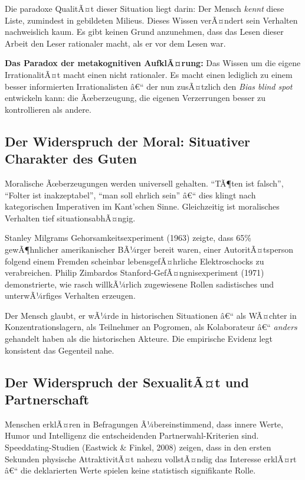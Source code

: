 ﻿\documentclass[12pt, a4paper]{article}
\begin{document}
Die paradoxe QualitÃ¤t dieser Situation liegt darin: Der Mensch \emph{kennt} diese
Liste, zumindest in gebildeten Milieus. Dieses Wissen verÃ¤ndert sein Verhalten
nachweislich kaum. Es gibt keinen Grund anzunehmen, dass das Lesen dieser Arbeit
den Leser rationaler macht, als er vor dem Lesen war.

\begin{infobox}
\textbf{Das Paradox der metakognitiven AufklÃ¤rung:} Das Wissen um die eigene
IrrationalitÃ¤t macht einen nicht rationaler. Es macht einen lediglich zu einem
besser informierten Irrationalisten â€“ der nun zusÃ¤tzlich den \emph{Bias blind spot}
entwickeln kann: die Ãœberzeugung, die eigenen Verzerrungen besser zu kontrollieren
als andere.
\end{infobox}

\subsection{Der Widerspruch der Moral: Situativer Charakter des Guten}

Moralische Ãœberzeugungen werden universell gehalten. \enquote{TÃ¶ten ist falsch},
\enquote{Folter ist inakzeptabel}, \enquote{man soll ehrlich sein} â€“ dies klingt
nach kategorischen Imperativen im Kant'schen Sinne. Gleichzeitig ist moralisches
Verhalten tief situationsabhÃ¤ngig.

Stanley Milgrams Gehorsamkeitsexperiment (1963) zeigte, dass 65\% gewÃ¶hnlicher
amerikanischer BÃ¼rger bereit waren, einer AutoritÃ¤tsperson folgend einem
Fremden scheinbar lebensgefÃ¤hrliche Elektroschocks zu verabreichen. Philip
Zimbardos Stanford-GefÃ¤ngnisexperiment (1971) demonstrierte, wie rasch willkÃ¼rlich
zugewiesene Rollen sadistisches und unterwÃ¼rfiges Verhalten erzeugen.

Der Mensch glaubt, er wÃ¼rde in historischen Situationen â€“ als WÃ¤chter in
Konzentrationslagern, als Teilnehmer an Pogromen, als Kolaborateur â€“
\emph{anders} gehandelt haben als die historischen Akteure. Die empirische
Evidenz legt konsistent das Gegenteil nahe.

\subsection{Der Widerspruch der SexualitÃ¤t und Partnerschaft}

Menschen erklÃ¤ren in Befragungen Ã¼bereinstimmend, dass innere Werte,
Humor und Intelligenz die entscheidenden Partnerwahl-Kriterien sind.
Speeddating-Studien (Eastwick \& Finkel, 2008) zeigen, dass in den ersten
Sekunden physische AttraktivitÃ¤t nahezu vollstÃ¤ndig das Interesse erklÃ¤rt
â€“ die deklarierten Werte spielen keine statistisch signifikante Rolle.
\end{document}
